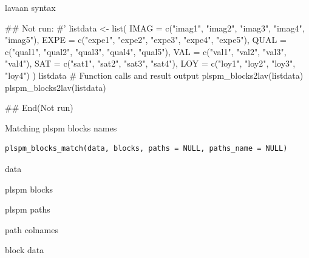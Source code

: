\documentclass[a4paper]{book}
\begin{document}
%
\begin{Value}
lavaan syntax
\end{Value}
%
\begin{Examples}
\begin{ExampleCode}

## Not run: 
#'
listdata <- list(
  IMAG = c("imag1", "imag2", "imag3", "imag4", "imag5"),
  EXPE = c("expe1", "expe2", "expe3", "expe4", "expe5"),
  QUAL = c("qual1", "qual2", "qual3", "qual4", "qual5"),
  VAL = c("val1", "val2", "val3", "val4"),
  SAT = c("sat1", "sat2", "sat3", "sat4"),
  LOY = c("loy1", "loy2", "loy3", "loy4")
)
listdata
# Function calls and result output
plspm_blocks2lav(listdata)
plspm_blocks2lav(listdata)%

## End(Not run)

\end{ExampleCode}
\end{Examples}
%
\begin{Description}
Matching plspm blocks names
\end{Description}
%
\begin{Usage}
\begin{verbatim}
plspm_blocks_match(data, blocks, paths = NULL, paths_name = NULL)
\end{verbatim}
\end{Usage}
%
\begin{Arguments}
\begin{ldescription}
\item[\code{data}] data

\item[\code{blocks}] plspm blocks

\item[\code{paths}] plspm paths

\item[\code{paths\_name}] path colnames
\end{ldescription}
\end{Arguments}
%
\begin{Value}
block data
\end{Value}
%
\end{document}
